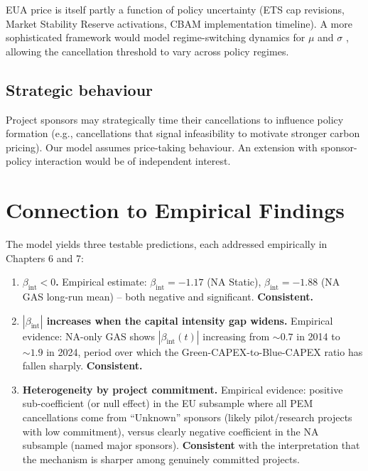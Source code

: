 \documentclass[11pt,a4paper]{article}
\newcommand{\bint}{\beta_{\mathrm{int}}}
\begin{document}
EUA price is itself partly a function of policy uncertainty (ETS cap revisions, Market Stability Reserve activations, CBAM implementation timeline). A more sophisticated framework would model regime-switching dynamics for $\mu$ and $\sigma$ \citep{creal2013generalized}, allowing the cancellation threshold to vary across policy regimes.

\subsection{Strategic behaviour}

Project sponsors may strategically time their cancellations to influence policy formation (e.g., cancellations that signal infeasibility to motivate stronger carbon pricing). Our model assumes price-taking behaviour. An extension with sponsor-policy interaction would be of independent interest.

\section{Connection to Empirical Findings}
\label{sec:ch3-empirical-connection}

The model yields three testable predictions, each addressed empirically in Chapters 6 and 7:

\begin{enumerate}
    \item \textbf{$\bint < 0$.} Empirical estimate: $\bint = -1.17$ (NA Static), $\bint = -1.88$ (NA GAS long-run mean) -- both negative and significant. \textbf{Consistent.}
    \item \textbf{$|\bint|$ increases when the capital intensity gap widens.} Empirical evidence: NA-only GAS shows $|\bint(t)|$ increasing from $\sim 0.7$ in 2014 to $\sim 1.9$ in 2024, period over which the Green-CAPEX-to-Blue-CAPEX ratio has fallen sharply. \textbf{Consistent.}
    \item \textbf{Heterogeneity by project commitment.} Empirical evidence: positive sub-coefficient (or null effect) in the EU subsample where all PEM cancellations come from ``Unknown'' sponsors (likely pilot/research projects with low commitment), versus clearly negative coefficient in the NA subsample (named major sponsors). \textbf{Consistent} with the interpretation that the mechanism is sharper among genuinely committed projects.
\end{enumerate}
\end{document}
